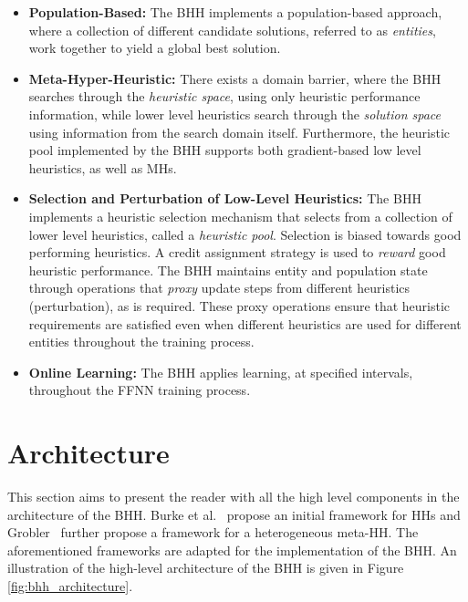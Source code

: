 \begin{itemize}
      \item \textbf{Population-Based:} The \acs{BHH} implements a population-based approach, where a collection of different candidate solutions, referred to as \textit{entities}, work together to yield a global best solution.

      \item \textbf{Meta-Hyper-Heuristic:} There exists a domain barrier, where the \acs{BHH} searches through the \textit{heuristic space}, using only heuristic performance information, while lower level heuristics search through the \textit{solution space} using information from the search domain itself. Furthermore, the heuristic pool implemented by the \acs{BHH} supports both gradient-based low level heuristics, as well as \acp{MH}.

      \item \textbf{Selection and Perturbation of Low-Level Heuristics:} The \acs{BHH} implements a heuristic selection mechanism that selects from a collection of lower level heuristics, called a \textit{heuristic pool}. Selection is biased towards good performing heuristics. A credit assignment strategy is used to \textit{reward} good heuristic performance. The \acs{BHH} maintains entity and population state through operations that \textit{proxy} update steps from different heuristics (perturbation), as is required. These proxy operations ensure that heuristic requirements are satisfied even when different heuristics are used for different entities throughout the training process.

      \item \textbf{Online Learning:} The \acs{BHH} applies learning, at specified intervals, throughout the \acs{FFNN} training process.
\end{itemize}

\section{Architecture}\label{sec:bhh:architecture}

This section aims to present the reader with all the high level components in the architecture of the \Acs{BHH}. Burke et al.~\cite{ref:burke:2010} propose an initial framework for \acp{HH} and Grobler~\cite{ref:grobler:2015} further propose a framework for a heterogeneous meta-\ac{HH}. The aforementioned frameworks are adapted for the implementation of the \Acs{BHH}. An illustration of the high-level architecture of the \Acs{BHH} is given in Figure \ref{fig:bhh_architecture}.

